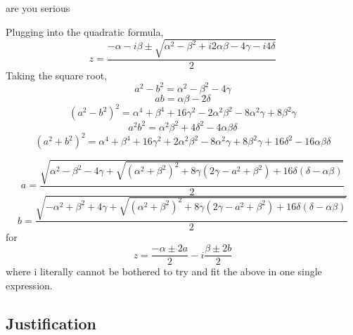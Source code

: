 \subsubsection{}
are you serious

Plugging into the quadratic formula,
\[z=\frac{-\alpha-i\beta\pm\sqrt{\alpha^2-\beta^2+i2\alpha\beta - 4\gamma - i4\delta}}{2}\]
Taking the square root,
\[a^2-b^2=\alpha^2-\beta^2-4\gamma\]
\[ab = \alpha\beta - 2\delta\]
\[(a^2-b^2)^2 = \alpha^4+\beta^4+16\gamma^2-2\alpha^2\beta^2-8\alpha^2\gamma+8\beta^2\gamma\]
\[a^2b^2 = \alpha^2\beta^2+4\delta^2-4\alpha\beta\delta\]
\[(a^2+b^2)^2 = \alpha^4+\beta^4+16\gamma^2 + 2\alpha^2\beta^2-8\alpha^2\gamma + 8\beta^2\gamma + 16\delta^2 - 16\alpha\beta\delta\]

\[a=\frac{\sqrt{\alpha^2-\beta^2-4\gamma + \sqrt{(\alpha^2+\beta^2)^2+8\gamma(2\gamma - a^2+\beta^2) + 16\delta(\delta-\alpha\beta)}}}{2}\]
\[b=\frac{\sqrt{-\alpha^2+\beta^2+4\gamma + \sqrt{(\alpha^2+\beta^2)^2+8\gamma(2\gamma - a^2+\beta^2) + 16\delta(\delta-\alpha\beta)}}}{2}\]
for
\[z = \frac{-\alpha\pm 2a}{2} -i \frac{\beta\pm 2b}{2}\]
where i literally cannot be bothered to try and fit the above in one single expression.

\subsection{Justification}
